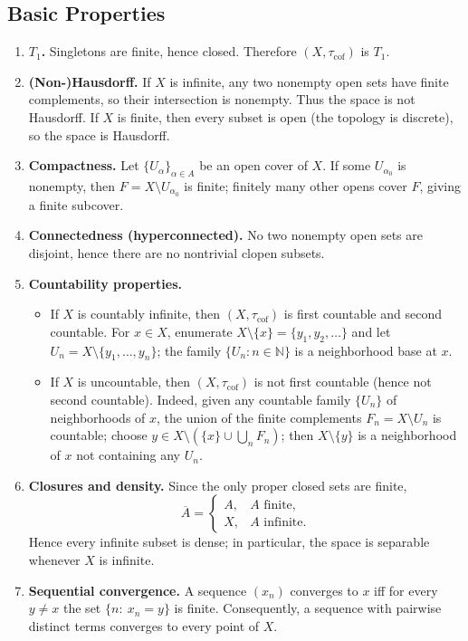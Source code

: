 \documentclass[12pt,a4paper]{article}
\theoremstyle{plain}
\theoremstyle{definition}
\theoremstyle{remark}
\theoremstyle{remark}
\begin{document}
	\subsection*{Basic Properties}
	\begin{enumerate}
		\item \textbf{$T_1$.} Singletons are finite, hence closed. Therefore $(X,\tau_{\mathrm{cof}})$ is $T_1$.
		\item \textbf{(Non-)Hausdorff.} If $X$ is infinite, any two nonempty open sets have finite complements, so their intersection is nonempty. Thus the space is not Hausdorff. If $X$ is finite, then every subset is open (the topology is discrete), so the space is Hausdorff.
		\item \textbf{Compactness.} Let $\{U_\alpha\}_{\alpha\in A}$ be an open cover of $X$. If some $U_{\alpha_0}$ is nonempty, then $F=X\setminus U_{\alpha_0}$ is finite; finitely many other opens cover $F$, giving a finite subcover.
		\item \textbf{Connectedness (hyperconnected).} No two nonempty open sets are disjoint, hence there are no nontrivial clopen subsets.
		\item \textbf{Countability properties.}
		\begin{itemize}
			\item If $X$ is countably infinite, then $(X,\tau_{\mathrm{cof}})$ is first countable and second countable. For $x\in X$, enumerate $X\setminus\{x\}=\{y_1,y_2,\dots\}$ and let $U_n=X\setminus\{y_1,\dots,y_n\}$; the family $\{U_n:n\in\mathbb{N}\}$ is a neighborhood base at $x$.
			\item If $X$ is uncountable, then $(X,\tau_{\mathrm{cof}})$ is not first countable (hence not second countable). Indeed, given any countable family $\{U_n\}$ of neighborhoods of $x$, the union of the finite complements $F_n=X\setminus U_n$ is countable; choose $y\in X\setminus(\{x\}\cup\bigcup_n F_n)$; then $X\setminus\{y\}$ is a neighborhood of $x$ not containing any $U_n$.
		\end{itemize}
		\item \textbf{Closures and density.} Since the only proper closed sets are finite,
		\[
		\overline{A}=\begin{cases}
			A, & A \text{ finite},\\
			X, & A \text{ infinite}.
		\end{cases}
		\]
		Hence every infinite subset is dense; in particular, the space is separable whenever $X$ is infinite.
		\item \textbf{Sequential convergence.} A sequence $(x_n)$ converges to $x$ iff for every $y\neq x$ the set $\{n:\ x_n=y\}$ is finite. Consequently, a sequence with pairwise distinct terms converges to every point of $X$.
	\end{enumerate}
	
\end{document}
